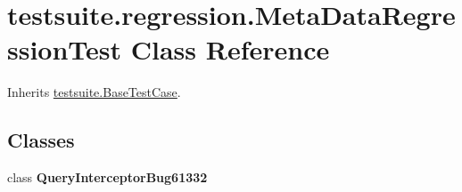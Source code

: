 \hypertarget{classtestsuite_1_1regression_1_1_meta_data_regression_test}{}\section{testsuite.\+regression.\+Meta\+Data\+Regression\+Test Class Reference}
\label{classtestsuite_1_1regression_1_1_meta_data_regression_test}


Inherits \mbox{\hyperlink{classtestsuite_1_1_base_test_case}{testsuite.\+Base\+Test\+Case}}.

\subsection*{Classes}
\begin{DoxyCompactItemize}
\item 
class {\bfseries Query\+Interceptor\+Bug61332}
\end{DoxyCompactItemize}
